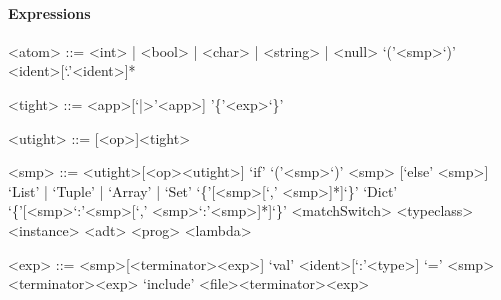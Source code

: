 \documentclass[11pt]{article} %
\begin{document}
\paragraph{Expressions}

\begin{grammar}

<atom> ::= <int> | <bool> | <char> | <string> | <null>
\alt `('<smp>`)'
\alt <ident>[`.'<ident>]*

<tight> ::= <app>[`|>'<app>]
\alt '\{'<exp>`\}'

<utight> ::= [<op>]<tight>

<smp> ::= <utight>[<op><utight>]
\alt `if' `('<smp>`)' <smp> [`else' <smp>]
\alt `List' | `Tuple' | `Array' | `Set' `\{'[<smp>[`,' <smp>]*]`\}'
\alt `Dict' `\{'[<smp>`:'<smp>[`,' <smp>`:'<smp>]*]`\}'
\alt <matchSwitch>
\alt <typeclass>
\alt <instance>
\alt <adt>
\alt <prog>
\alt <lambda>

<exp> ::= <smp>[<terminator><exp>]
\alt [`lazy'] `val' <ident>[`:'<type>] `=' <smp><terminator><exp>
\alt `include' <file><terminator><exp>

\end{grammar}
\end{document}
